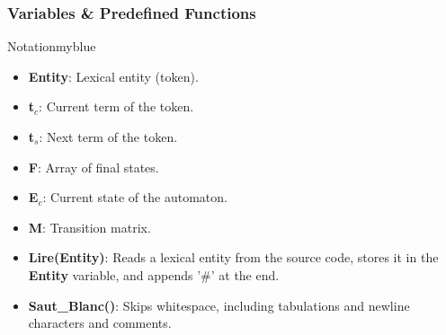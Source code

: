 \vspace{1cm}

\subsubsection{Variables \& Predefined Functions}
\begin{prettyBox}{Notation}{myblue}
\begin{itemize}
    \item \textbf{Entity}: Lexical entity (token).
    \item \textbf{t\(_c\)}: Current term of the token.
    \item \textbf{t\(_s\)}: Next term of the token.
    \item \textbf{F}: Array of final states.
    \item \textbf{E\(_c\)}: Current state of the automaton.
    \item \textbf{M}: Transition matrix.
    \item \textbf{Lire(Entity)}: Reads a lexical entity from the source code, stores it in the \textbf{Entity} 
    variable, and appends '\#' at the end.
    \item \textbf{Saut\_Blanc()}: Skips whitespace, including tabulations and newline characters and comments.
\end{itemize}
\end{prettyBox}

\newpage

